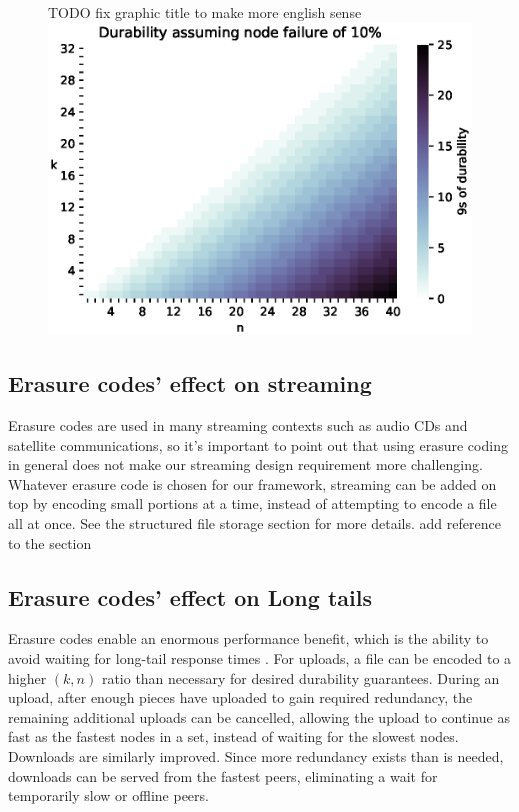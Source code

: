 \documentclass[11pt,fleqn,openany]{book}
\newcommand{\todo}[1]{{\color{red} TODO #1 }}
\newcommand{\bs}[1]{{\color{red}#1}}
\begin{document}
{\begin{figure} \centering
\todo{fix graphic title to make more english sense}
\includegraphics[width=\linewidth]{durability/durability.eps}
\label{fig:durability}
\end{figure}

}

\subsection{Erasure codes' effect on streaming}

Erasure codes are used in many streaming contexts such as audio CDs and
satellite communications, so it's important to point out that using erasure
coding in general does not make our streaming design requirement more
challenging. Whatever erasure code is chosen for our framework, streaming can be
added on top by encoding small portions at a time, instead of attempting to
encode a file all at once. See the structured file storage section for more
details. \bs{add reference to the section}

\subsection{Erasure codes' effect on Long tails}

Erasure codes enable an enormous performance benefit, which is the ability to
avoid waiting for long-tail response times \cite{tail-at-scale}. For uploads, a
file can be encoded to a higher $(k, n)$ ratio than necessary for desired
durability
guarantees. During an upload, after enough pieces have uploaded to gain required
redundancy, the remaining additional uploads can be cancelled, allowing the
upload to continue as fast as the fastest nodes in a set, instead of waiting
for the slowest nodes.
Downloads are similarly improved. Since more redundancy exists
than is needed, downloads can be served from the fastest peers, eliminating a
wait for temporarily slow or offline peers.
\end{document}
